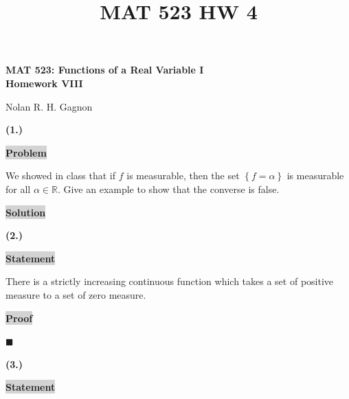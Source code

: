 \documentclass[12pt]{article}
\title{MAT 523 HW 4}
\newcommand{\mybox}{%
    \collectbox{%
        \setlength{\fboxsep}{2pt}%
        \fbox{\BOXCONTENT}%
    }%
}
\begin{document}
\begin{center}
\begin{large}
\textbf{MAT 523: Functions of a Real Variable I \\
Homework VIII \\}
\end{large}
Nolan R. H. Gagnon \\
\end{center}

\noindent \textbf{(1.)}

\vspace{3mm}

\noindent\mybox{\colorbox{lightgray}{\textbf{Problem}}}\hspace{3mm}\hrulefill

\noindent We showed in class that if $f$ is measurable, then the set $\left\lbrace f=\alpha \right\rbrace$ is measurable for all $\alpha\in\mathbb{R}$. Give an example to show that the converse is false. 

\vspace{5mm}

\noindent\mybox{\colorbox{lightgray}{\textbf{Solution}}}\hspace{3mm}\hrulefill

\noindent 

\pagebreak

\noindent \textbf{(2.)} 

\vspace{3mm}

\noindent\mybox{\colorbox{lightgray}{\textbf{Statement}}}\hspace{3mm}\hrulefill 

\noindent There is a strictly increasing continuous function which takes a set of positive measure to a set of zero measure. 

\vspace{5mm}

\noindent\mybox{\colorbox{lightgray}{\textbf{Proof}}}\hspace{3mm}\hrulefill

\noindent 

\vspace{3mm}

\noindent 

\hfill$\blacksquare$

\pagebreak

\noindent \textbf{(3.)}

\vspace{3mm}

\noindent\mybox{\colorbox{lightgray}{\textbf{Statement}}}\hspace{3mm}\hrulefill
\end{document}

